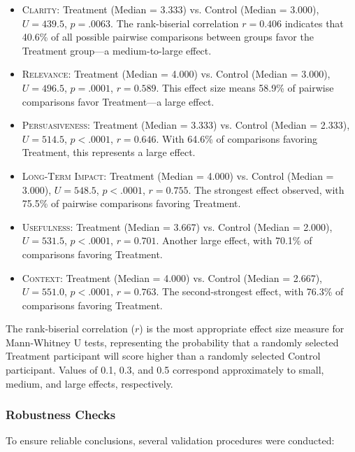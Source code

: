 \documentclass[sigconf, authorversion, nonacm, screen]{acmart}
\begin{document}
\begin{itemize}
    \item \textsc{Clarity}: Treatment (Median = 3.333) vs. Control (Median = 3.000), $U = 439.5$, $p = .0063$. The rank-biserial correlation $r = 0.406$ indicates that 40.6\% of all possible pairwise comparisons between groups favor the Treatment group—a medium-to-large effect.
    
    \item \textsc{Relevance}: Treatment (Median = 4.000) vs. Control (Median = 3.000), $U = 496.5$, $p = .0001$, $r = 0.589$. This effect size means 58.9\% of pairwise comparisons favor Treatment—a large effect.
    
    \item \textsc{Persuasiveness}: Treatment (Median = 3.333) vs. Control (Median = 2.333), $U = 514.5$, $p < .0001$, $r = 0.646$. With 64.6\% of comparisons favoring Treatment, this represents a large effect.
    
    \item \textsc{Long-Term Impact}: Treatment (Median = 4.000) vs. Control (Median = 3.000), $U = 548.5$, $p < .0001$, $r = 0.755$. The strongest effect observed, with 75.5\% of pairwise comparisons favoring Treatment.
    
    \item \textsc{Usefulness}: Treatment (Median = 3.667) vs. Control (Median = 2.000), $U = 531.5$, $p < .0001$, $r = 0.701$. Another large effect, with 70.1\% of comparisons favoring Treatment.
    
    \item \textsc{Context}: Treatment (Median = 4.000) vs. Control (Median = 2.667), $U = 551.0$, $p < .0001$, $r = 0.763$. The second-strongest effect, with 76.3\% of comparisons favoring Treatment.
\end{itemize}

The rank-biserial correlation ($r$) is the most appropriate effect size measure for Mann-Whitney U tests, representing the probability that a randomly selected Treatment participant will score higher than a randomly selected Control participant. Values of 0.1, 0.3, and 0.5 correspond approximately to small, medium, and large effects, respectively.

\subsubsection{Robustness Checks}

To ensure reliable conclusions, several validation procedures were conducted:
\end{document}
